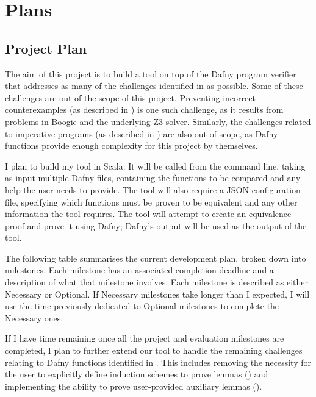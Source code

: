 \chapter{Plans}\label{chp:plans}

\section{Project Plan}\label{sec:project-plan}

The aim of this project is to build a tool on top of the Dafny program verifier that addresses as many of the challenges identified in  as possible. Some of these challenges are out of the scope of this project. Preventing incorrect counterexamples (as described in ) is one such challenge, as it results from problems in Boogie and the underlying Z3 solver. Similarly, the challenges related to imperative programs (as described in ) are also out of scope, as Dafny functions provide enough complexity for this project by themselves.

I plan to build my tool in Scala. It will be called from the command line, taking as input multiple Dafny files, containing the functions to be compared and any help the user needs to provide. The tool will also require a JSON configuration file, specifying which functions must be proven to be equivalent and any other information the tool requires. The tool will attempt to create an equivalence proof and prove it using Dafny; Dafny's output will be used as the output of the tool.

The following table summarises the current development plan, broken down into milestones. Each milestone has an associated completion deadline and a description of what that milestone involves. Each milestone is described as either Necessary or Optional. If Necessary milestones take longer than I expected, I will use the time previously dedicated to Optional milestones to complete the Necessary ones.

If I have time remaining once all the project and evaluation milestones are completed, I plan to further extend our tool to handle the remaining challenges relating to Dafny functions identified in . This includes removing the necessity for the user to explicitly define induction schemes to prove lemmas () and implementing the ability to prove user-provided auxiliary lemmas ().

